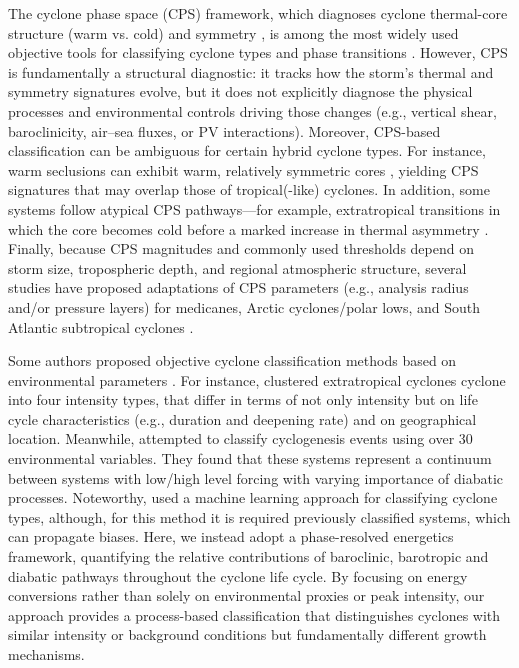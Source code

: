 \documentclass[pdflatex,sn-chicago]{sn-jnl}%
\theoremstyle{plain}
\theoremstyle{definition}
\theoremstyle{remark}
\theoremstyle{definition}
\begin{document}
The cyclone phase space (CPS) framework, which diagnoses cyclone thermal-core structure (warm vs. cold) and symmetry \citep{hart2003cyclone}, is among the most widely used objective tools for classifying cyclone types and phase transitions \citep{wood2023phase}. However, CPS is fundamentally a structural diagnostic: it tracks how the storm’s thermal and symmetry signatures evolve, but it does not explicitly diagnose the physical processes and environmental controls driving those changes (e.g., vertical shear, baroclinicity, air–sea fluxes, or PV interactions). Moreover, CPS-based classification can be ambiguous for certain hybrid cyclone types. For instance, warm seclusions can exhibit warm, relatively symmetric cores \citep[e.g.,][]{dekker2018characteristics}, yielding CPS signatures that may overlap those of tropical(-like) cyclones. In addition, some systems follow atypical CPS pathways—for example, extratropical transitions in which the core becomes cold before a marked increase in thermal asymmetry \citep{kitabatake2011climatology}. Finally, because CPS magnitudes and commonly used thresholds depend on storm size, tropospheric depth, and regional atmospheric structure, several studies have proposed adaptations of CPS parameters (e.g., analysis radius and/or pressure layers) for medicanes, Arctic cyclones/polar lows, and South Atlantic subtropical cyclones \citep{gozzo2014subtropical,comellas2021evaluation,croad2023role,saraceni2023mediterranean,miglietta2025defining}.

Some authors proposed objective cyclone classification methods based on environmental parameters \citep[e.g][]{yanase2014parameter,emanuel2025cyclops}. For instance, \citet{corner2025classification} clustered extratropical cyclones cyclone into four intensity types, that differ in terms of not only intensity but on life cycle characteristics (e.g., duration and deepening rate) and on geographical location. Meanwhile, \citet{graf2017objective} attempted to classify cyclogenesis events using over 30 environmental variables. They found that these systems represent a continuum between systems with low/high level forcing with varying importance of diabatic processes. Noteworthy, \citet{han2025system} used a machine learning approach for classifying cyclone types, although, for this method it is required previously classified systems, which can propagate biases. Here, we instead adopt a phase-resolved energetics framework, quantifying the relative contributions of baroclinic, barotropic and diabatic pathways throughout the cyclone life cycle. By focusing on energy conversions rather than solely on environmental proxies or peak intensity, our approach provides a process-based classification that distinguishes cyclones with similar intensity or background conditions but fundamentally different growth mechanisms.
\end{document}
